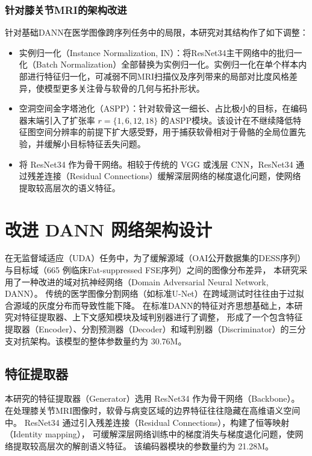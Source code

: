     \subsubsection{针对膝关节MRI的架构改进}
      针对基础DANN在医学图像跨序列任务中的局限，本研究对其结构作了如下调整：
      \begin{itemize}
        \item 实例归一化（Instance Normalization, IN）：将ResNet34主干网络中的批归一化（Batch Normalization）全部替换为实例归一化。实例归一化在单个样本内部进行特征归一化，可减弱不同MRI扫描仪及序列带来的局部对比度风格差异，使模型更多关注骨与软骨的几何与拓扑形状。
        \item 空洞空间金字塔池化（ASPP）：针对软骨这一细长、占比极小的目标，在编码器末端引入了扩张率 $r=\{1,6,12,18\}$ 的ASPP模块。该设计在不继续降低特征图空间分辨率的前提下扩大感受野，用于捕获软骨相对于骨骼的全局位置先验，并缓解小目标特征丢失问题。
        \item 将 ResNet34 作为骨干网络。相较于传统的 VGG 或浅层 CNN，ResNet34 通过残差连接（Residual Connections）缓解深层网络的梯度退化问题，使网络提取较高层次的语义特征。
      \end{itemize}

\section{改进 DANN 网络架构设计}
  在无监督域适应（UDA）任务中，为了缓解源域（OAI公开数据集的DESS序列）与目标域（\num{665} 例临床Fat-suppressed FSE序列）之间的图像分布差异，
  本研究采用了一种改进的域对抗神经网络（Domain Adversarial Neural Network, DANN）。
  传统的医学图像分割网络（如标准U-Net）在跨域测试时往往由于过拟合源域的灰度分布而导致性能下降。
  在标准DANN的特征对齐思想基础上，本研究对特征提取器、上下文感知模块及域判别器进行了调整，
  形成了一个包含特征提取器（Encoder）、分割预测器（Decoder）和域判别器（Discriminator）的三分支对抗架构。该模型的整体参数量约为 30.76M。
  \subsection{特征提取器}
    本研究的特征提取器（Generator）选用 ResNet34 作为骨干网络（Backbone）。
    在处理膝关节MRI图像时，软骨与病变区域的边界特征往往隐藏在高维语义空间中。
    ResNet34 通过引入残差连接（Residual Connections），构建了恒等映射（Identity mapping），
    可缓解深层网络训练中的梯度消失与梯度退化问题，使网络提取较高层次的解剖语义特征。
    该编码器模块的参数量约为 21.28M。
